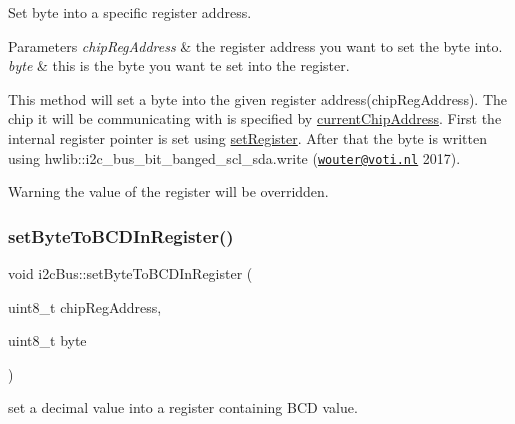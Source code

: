 Set byte into a specific register address. 


\begin{DoxyParams}{Parameters}
{\em chip\+Reg\+Address} & the register address you want to set the byte into. \\
\hline
{\em byte} & this is the byte you want te set into the register.\\
\hline
\end{DoxyParams}
This method will set a byte into the given register address(chip\+Reg\+Address). The chip it will be communicating with is specified by \mbox{\hyperlink{classi2c_bus_a64ff87527c88619d72ede947d73eac3a}{current\+Chip\+Address}}. First the internal register pointer is set using \mbox{\hyperlink{classi2c_bus_adee2545c8b692474b6814b4605e48ec3}{set\+Register}}. After that the byte is written using hwlib\+::i2c\+\_\+bus\+\_\+bit\+\_\+banged\+\_\+scl\+\_\+sda.\+write (\href{mailto:wouter@voti.nl}{\tt wouter@voti.\+nl} 2017). \begin{DoxyWarning}{Warning}
the value of the register will be overridden. 
\end{DoxyWarning}
\mbox{\label{classi2c_bus_a31c36069cff15f73aa54703a6ee8b951}} 
\subsubsection{\texorpdfstring{set\+Byte\+To\+B\+C\+D\+In\+Register()}{setByteToBCDInRegister()}}
{\footnotesize\ttfamily void i2c\+Bus\+::set\+Byte\+To\+B\+C\+D\+In\+Register (\begin{DoxyParamCaption}\item[{uint8\+\_\+t}]{chip\+Reg\+Address,  }\item[{uint8\+\_\+t}]{byte }\end{DoxyParamCaption})}



set a decimal value into a register containing B\+CD value. 


